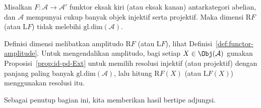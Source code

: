 \begin{korolari}
	Misalkan $F:\mathcal{A}\to\mathcal{A}'$ funktor eksak kiri (atau eksak
	kanan) antarkategori abelian, dan $\mathcal{A}$ mempunyai cukup banyak objek
	injektif serta projektif. Maka dimensi $\mathrm{R}F$ (atau $\mathrm{L}F$)
	tidak melebihi $\mathrm{gl.dim}(\mathcal{A})$.
\end{korolari}
\begin{bukti}
	Definisi dimensi melibatkan amplitudo $\mathrm{R}F$ (atau $\mathrm{L}F$),
	lihat Definisi~\ref{def:functor-amplitude}. Untuk mengendalikan amplitudo,
	bagi setiap $X\in\Obj(\mathcal{A})$ gunakan
	Proposisi~\ref{prop:id-pd-Ext} untuk memilih resolusi injektif (atau
	projektif) dengan panjang paling banyak $\mathrm{gl.dim}(\mathcal{A})$, lalu
	hitung $\mathrm{R}F(X)$ (atau $\mathrm{L}F(X)$) menggunakan resolusi itu.
\end{bukti}

Sebagai penutup bagian ini, kita memberikan hasil bertipe adjungsi.

